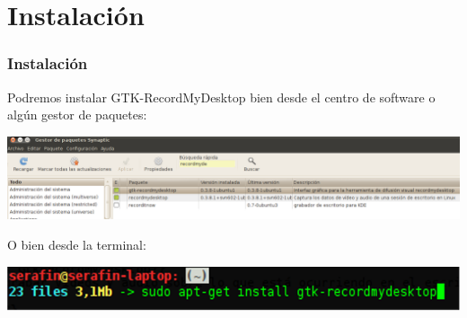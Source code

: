 \documentclass{beamer}
\begin{document}
	\section{Instalación}
		\begin{frame}
			\frametitle{Instalación}
			Podremos instalar GTK-RecordMyDesktop bien desde el centro de software o algún gestor de paquetes:
			\begin{center}
				\includegraphics[height=0.3\textheight, keepaspectratio=true]{Imagenes/Instalacion/01_Synaptic.png}
			\end{center}
			O bien desde la terminal:
			\begin{center}
				\includegraphics[height=0.1\textheight, keepaspectratio=true]{Imagenes/Instalacion/02_Terminal.png}
			\end{center}
		\end{frame}
\end{document}
